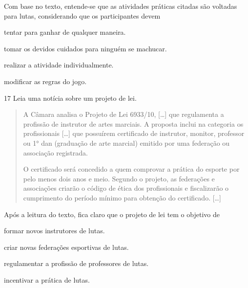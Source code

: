 \noindent{}Com base no texto, entende-se que as atividades práticas citadas são voltadas para
lutas, considerando que os participantes devem

\begin{escolha}
\item tentar para ganhar de qualquer maneira.

\item tomar os devidos cuidados para ninguém se machucar.

\item realizar a atividade individualmente.

\item modificar as regras do jogo.
\end{escolha}


\num{17} Leia uma notícia sobre um projeto de lei.
\begin{quote}
  A Câmara analisa o Projeto de Lei 6933/10, {[}\ldots{}{]} que regulamenta a
  profissão de instrutor de artes marciais. A proposta inclui na
  categoria os profissionais {[}\ldots{}{]} que possuírem certificado de
  instrutor, monitor, professor ou 1° dan (graduação de arte marcial)
  emitido por uma federação ou associação registrada.

O certificado será concedido a quem comprovar a prática do esporte por
pelo menos dois anos e meio. Segundo o projeto, as federações e
associações criarão o código de ética dos profissionais e fiscalizarão o
cumprimento do período mínimo para obtenção do certificado. {[}\ldots{}{]}

\end{quote}

\noindent{}Após a leitura do texto, fica claro que o projeto de lei tem o objetivo de

\begin{escolha}
\item formar novos instrutores de lutas.

\item criar novas federações esportivas de lutas.

\item regulamentar a profissão de professores de lutas.

\item incentivar a prática de lutas.
\end{escolha}

